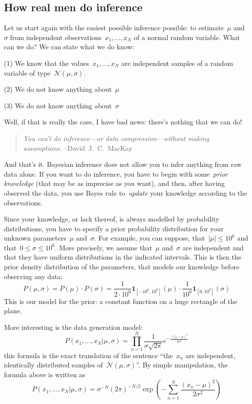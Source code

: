 \subsection{How real men do inference}

Let us start again with the easiest possible inference possible: to
estimate~$\mu$ and~$\sigma$ from independent observations~$x_1,\ldots,x_N$ of
a normal random variable.  What can we do?  We can state what we do know:

(1) We know that the values~$x_1,\ldots,x_N$ are independent samples of a
random variable of type~$\mathcal{N}(\mu,\sigma)$.

(2) We do not know anything about~$\mu$

(3) We do not know anything about~$\sigma$

Well, if that is really the case, I have bad news: there's nothing that we
can do!

\begin{quote}
	\emph{You can't do inference---or data compression---without
	making assumptions.}\newline
	--David~J.~C.~MacKay
\end{quote}

And that's it.  Bayesian inference does not allow you to infer
anything from raw data alone.  If you want to do inference, you have to begin with
some~\emph{prior knowledge} (that may be as imprecise as you want), and then,
after having observed the data, you use Bayes rule to~\emph{update} your
knowledge according to the observations.

Since your knowledge, or lack thereof, is always modelled by probability
distributions, you have to specify a prior probability
distribution for your unknown parameters~$\mu$ and~$\sigma$.  For example,
you can suppose, that~$|\mu|\le10^6$ and
that~$0\le\sigma\le10^6$.  More precisely, we assume that~$\mu$ and~$\sigma$
are independent and that they have uniform distributions in the indicated
intervals.  This is then the prior density distribution of the parameters, that
models our knowledge before observing any data:
$$
P(\mu,\sigma)=P(\mu)\cdot P(\sigma)=
\frac{1}{2\cdot10^6}\mathbf{1}_{\left[-10^6,10^6\right]}(\mu)
\cdot
\frac{1}{10^6}\mathbf{1}_{\left[0,10^6\right]}(\sigma)
$$
This is our model for the prior: a constant function on a huge rectangle of
the plane.

More interesting is the data generation model:
$$
P(x_1,\ldots,x_N|\mu,\sigma)=
\prod_{n=1}^N \frac{1}{\sigma\sqrt{2\pi}}e^{-\frac{(x_n-\mu)^2}{2\sigma^2}}
$$
this formula is the exact translation of the sentence ``the~$x_n$ are
independent, identically distributed samples of~$\mathcal{N}(\mu,\sigma)$''.
By simple manipulation, the formula above is written as
$$
P(x_1,\ldots,x_N|\mu,\sigma)=
\sigma^{-N}(2\pi)^{-N/2}\exp\left(-\sum_{n=1}^N\frac{(x_n-\mu)^2}{2\sigma^2}\right)
$$

